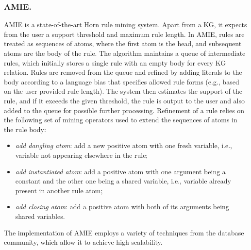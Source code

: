 \subsubsection{AMIE.}
AMIE \cite{amie} is a state-of-the-art Horn rule mining system.
Apart from a KG, it expects from the user a support threshold and maximum
rule length. In AMIE, rules are treated as sequences of atoms, where the first atom is the head, and subsequent atoms are the body of the rule. The algorithm maintains a queue of intermediate rules, which initially stores a single rule with an empty body for every KG relation. 
Rules are removed from the queue and refined by adding literals to the body according to a language bias that specifies allowed rule forms (e.g., based on the user-provided rule length). The system then estimates the support of the rule, and if it exceeds the given threshold, the rule is output to the user and also added to the queue for
possible further processing.
Refinement of a rule relies on the following set of mining operators used to extend the sequences of atoms in the rule body:
\begin{itemize}
\item \textit{add dangling atom}: add a new positive atom with one fresh variable, i.e., variable not appearing elsewhere in the rule;
\item \textit{add instantiated atom}: add a positive atom with one argument being a constant and the other one being a shared variable, i.e., variable already present in another rule atom;
\item \textit{add closing atom}:  add a positive atom with both of its arguments being shared variables.

\end{itemize}

The implementation of AMIE employs a variety of techniques from the database community, which allow it to achieve high scalability.

